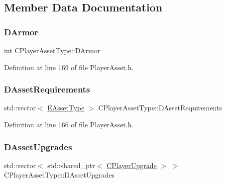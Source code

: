 \subsection{Member Data Documentation}
\hypertarget{classCPlayerAssetType_ac211254f807a497099509a3e96f7185a}{}\label{classCPlayerAssetType_ac211254f807a497099509a3e96f7185a} 
\subsubsection{\texorpdfstring{D\+Armor}{DArmor}}
{\footnotesize\ttfamily int C\+Player\+Asset\+Type\+::\+D\+Armor\hspace{0.3cm}{\ttfamily [protected]}}



Definition at line 169 of file Player\+Asset.\+h.

\hypertarget{classCPlayerAssetType_a76d89bd6479ac30a0452d0a8aaf731c5}{}\label{classCPlayerAssetType_a76d89bd6479ac30a0452d0a8aaf731c5} 
\subsubsection{\texorpdfstring{D\+Asset\+Requirements}{DAssetRequirements}}
{\footnotesize\ttfamily std\+::vector$<$ \hyperlink{GameDataTypes_8h_a5600d4fc433b83300308921974477fec}{E\+Asset\+Type} $>$ C\+Player\+Asset\+Type\+::\+D\+Asset\+Requirements\hspace{0.3cm}{\ttfamily [protected]}}



Definition at line 166 of file Player\+Asset.\+h.

\hypertarget{classCPlayerAssetType_aeb8d5c3ea81ea56248d02a5e24d48001}{}\label{classCPlayerAssetType_aeb8d5c3ea81ea56248d02a5e24d48001} 
\subsubsection{\texorpdfstring{D\+Asset\+Upgrades}{DAssetUpgrades}}
{\footnotesize\ttfamily std\+::vector$<$ std\+::shared\+\_\+ptr$<$ \hyperlink{classCPlayerUpgrade}{C\+Player\+Upgrade} $>$ $>$ C\+Player\+Asset\+Type\+::\+D\+Asset\+Upgrades\hspace{0.3cm}{\ttfamily [protected]}}



